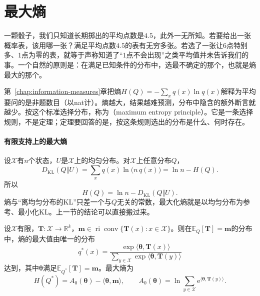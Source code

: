 \section{最大熵}
\label{sec:dsel-maxent}

一颗骰子，我们只知道长期掷出的平均点数是$4.5$，此外一无所知。若要给出一张概率表，该用哪一张？满足平均点数$4.5$的表有无穷多张。若选了一张让$6$点特别多、$1$点为零的表，就等于声称知道了“$1$点不会出现”之类平均值并未告诉我们的事。一个自然的原则是：在满足已知条件的分布中，选最不确定的那个，也就是熵最大的那个。

第~\ref{chap:information-measures}章把熵$H(Q)=-\sum_xq(x)\ln q(x)$解释为平均要问的是非题数目（以nat计）。熵越大，结果越难预测，分布中隐含的额外断言就越少。按这个标准选择分布，称为（maximum entropy principle）。它是一条选择规则，不是定理；定理要回答的是，按这条规则选出的分布是什么、何时存在。

\paragraph{有限支持上的最大熵}
设$\mathcal{X}$有$n$个状态，$U$是$\mathcal{X}$上的均匀分布。对$\mathcal{X}$上任意分布$Q$，
\[
 D_{\mathrm{KL}}(Q\Vert U)=\sum_xq(x)\ln\bigl(n\,q(x)\bigr)=\ln n-H(Q) .
\]
所以
\begin{equation}
 H(Q)=\ln n-D_{\mathrm{KL}}(Q\Vert U).
 \label{eq:dsel-entropy-kl-uniform}
\end{equation}
熵与“离均匀分布的KL”只差一个与$Q$无关的常数，最大化熵就是以均匀分布为参考、最小化KL。上一节的结论可以直接搬过来。

\begin{theorem}[有限支持上的最大熵分布]
\label{thm:dsel-maxent-finite}
设$\mathcal{X}$有限，$\bm{T}:\mathcal{X}\to\mathbb{R}^{k}$，$\bm{m}\in\operatorname{ri}\operatorname{conv}\{\bm{T}(x):x\in\mathcal{X}\}$。则在$\mathbb{E}_{Q}[\bm{T}]=\bm{m}$的分布中，熵的最大值由唯一的分布
\begin{equation}
 q^{*}(x)=\frac{\exp\langle\bm{\theta},\bm{T}(x)\rangle}{\sum_{y\in\mathcal{X}}\exp\langle\bm{\theta},\bm{T}(y)\rangle}
 \label{eq:dsel-maxent-finite}
\end{equation}
达到，其中$\bm{\theta}$满足$\mathbb{E}_{Q^{*}}[\bm{T}]=\bm{m}$。最大熵为
\begin{equation}
 H(Q^{*})=A_0(\bm{\theta})-\langle\bm{\theta},\bm{m}\rangle,\qquad A_0(\bm{\theta})=\ln\sum_{y\in\mathcal{X}}\mathrm{e}^{\langle\bm{\theta},\bm{T}(y)\rangle} .
 \label{eq:dsel-maxent-value}
\end{equation}
\end{theorem}

